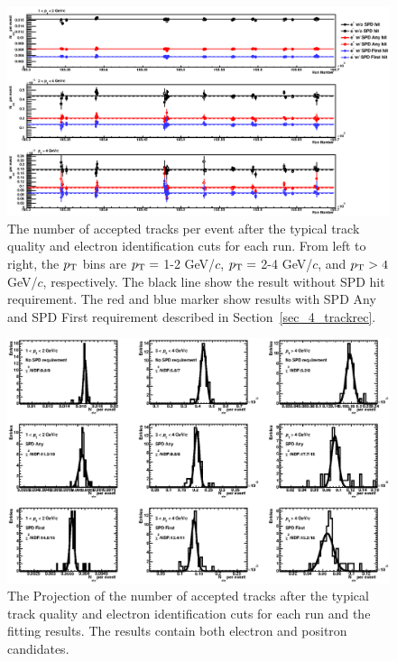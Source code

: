 \begin{figure}[!h]
  \centering
  \includegraphics[width=16cm]{chap4/figure/QA/RunbyRunQA_MB.eps}
  \caption{The number of accepted tracks per event after the typical track quality and electron identification cuts for each run. From left to right, the $p_{\rm{T}}$ bins are $p_{\rm{T}}=$ 1-2 GeV/$c$, $p_{\rm{T}}=$ 2-4 GeV/$c$, and $p_{\rm{T}}>4$ GeV/$c$, respectively. The black line show the result without SPD hit requirement. The red and blue marker show results with SPD Any and SPD First requirement described in Section~\ref{sec_4_trackrec}. }
  \label{fig_4_runqa_MB}
\end{figure}
\begin{figure}[!h]
  \centering
  \includegraphics[width=16cm]{chap4/figure/QA/RunbyRunQAPro_MB.eps}
  \caption{The Projection of the number of accepted tracks after the typical track quality and electron identification cuts for each run and the fitting results. The results contain both electron and positron candidates. }
  \label{fig_4_runqapro_MB}
\end{figure}

